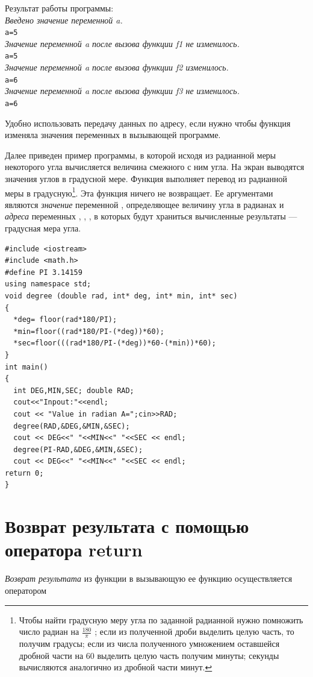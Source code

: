 Результат работы программы:\\
\emph{Введено значение переменной a.}\\
\verb!a=5! \\
\emph{Значение переменной a после вызова функции f1 не изменилось.}\\
\verb!a=5! \\
\emph{Значение переменной a после вызова функции f2 изменилось.}\\
\verb!a=6! \\
\emph{Значение переменной a после вызова функции f3 не изменилось.}\\
\verb!a=6! 

Удобно использовать передачу данных по адресу, если нужно чтобы функция изменяла значения переменных в вызывающей
программе.

Далее приведен пример программы, в которой исходя из радианной меры  некоторого угла вычисляется величина смежного с ним
угла. На экран выводятся значения углов в градусной мере. Функция  выполняет перевод из
радианной меры в градусную\footnote{Чтобы найти градусную меру угла по заданной радианной нужно помножить число радиан
на  $\frac{180}{\pi }$ ; если из полученной дроби выделить целую часть, то получим градусы; если из числа полученного
умножением оставшейся дробной части на 60 выделить целую часть получим минуты; секунды вычисляются аналогично из дробной
части минут.}. Эта функция ничего не возвращает. Ее аргументами являются \emph{значение} переменной
, определяющее величину угла в радианах и \emph{адреса} переменных
, , , в которых будут храниться вычисленные
результаты --- градусная мера угла. 
\begin{lstlisting}
#include <iostream>
#include <math.h>
#define PI 3.14159
using namespace std;
void degree (double rad, int* deg, int* min, int* sec)
{
  *deg= floor(rad*180/PI);
  *min=floor((rad*180/PI-(*deg))*60);
  *sec=floor(((rad*180/PI-(*deg))*60-(*min))*60);
}
int main()
{
  int DEG,MIN,SEC; double RAD;
  cout<<"Inpout:"<<endl;
  cout << "Value in radian A=";cin>>RAD;
  degree(RAD,&DEG,&MIN,&SEC);
  cout << DEG<<" "<<MIN<<" "<<SEC << endl;
  degree(PI-RAD,&DEG,&MIN,&SEC);
  cout << DEG<<" "<<MIN<<" "<<SEC << endl;
return 0;
}
\end{lstlisting}

\section[Возврат результата с помощью оператора return]{Возврат результата с помощью оператора return}
\emph{Возврат результата} из функции в вызывающую ее функцию
осуществляется оператором

